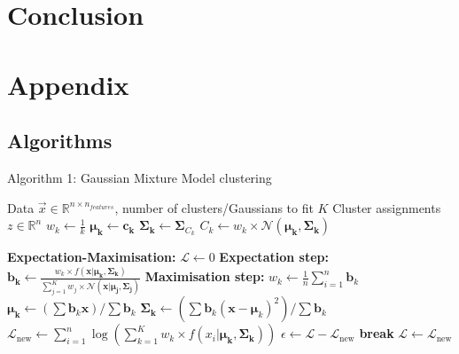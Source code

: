\documentclass[12pt]{report} %
\begin{document}
\chapter{Conclusion}



\chapter{Appendix}

\section{Algorithms}


\begin{definitionbox}{Algorithm 1: Gaussian Mixture Model clustering}
  \begin{algorithmic}[1]
    \State Data $\vec{x} \in \mathbb{R}^{n \times n_{features}}$, number of clusters/Gaussians to fit $K$ 
    \State Cluster assignments $z \in \mathbb{R}^n$ 
    \State $w_{k} \gets \frac{1}{k}$ 
    \State $\mathbf{\mu_{k}} \gets \mathbf{c_{k}}$ 
    \State $\mathbf{\Sigma_{k}} \gets \mathbf{\Sigma}_{C_{k}}$ 
    \State $C_{k} \gets w_{k} \times \mathcal{N}(\mathbf{\mu_{k}}, \mathbf{\Sigma_{k}})$ 

    \State \textbf{Expectation-Maximisation:}
    \State $\mathcal{L} \gets 0$ 
      \State \textbf{Expectation step:}
        \State $\mathbf{b_{k}} \gets \frac{w_{k} \times f(\mathbf{x}|\mathbf{\mu_{k}}, \mathbf{\Sigma_{k}})}{\sum_{j=1}^{K} w_{j} \times \mathcal{N}(\mathbf{x}|\mathbf{\mu_{j}}, \mathbf{\Sigma_{j}})}$ 
      \EndFor
      \State \textbf{Maximisation step:}
        \State $w_{k} \gets \frac{1}{n} \sum_{i=1}^{n} \mathbf{b}_{k}$ 
        \State $\mathbf{\mu_{k}} \gets (\sum \mathbf{b}_{k}\mathbf{x})/\sum \mathbf{b}_{k}$ 
        \State $\mathbf{\Sigma_{k}} \gets (\sum \mathbf{b}_{k}(\mathbf{x} - \mathbf{\mu}_{k})^{2})/\sum \mathbf{b}_{k}$ 
      \EndFor
      \State $\mathcal{L}_{\text{new}} \gets \sum_{i=1}^{n} \log(\sum_{k=1}^{K} w_{k} \times f(x_{i}|\mathbf{\mu_{k}}, \mathbf{\Sigma_{k}}))$ 
      \State $\epsilon \gets \mathcal{L} - \mathcal{L}_{\text{new}}$ 
        \State \textbf{break}
      \EndIf
      \State $\mathcal{L} \gets \mathcal{L}_{\text{new}}$ 
    \EndFor


\end{algorithmic}
\end{definitionbox}
\end{document}

